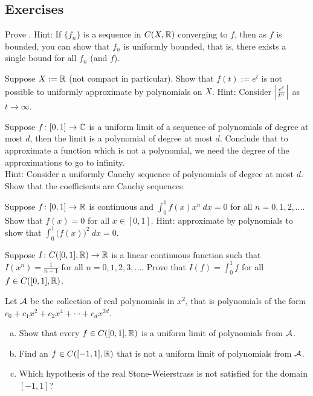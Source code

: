 \subsection{Exercises}

\begin{exercise}
Prove .
Hint: If $\{ f_n \}$ is a sequence in $C(X,{\mathbb{R}})$
converging to $f$, then as $f$ is bounded, you can show
that $f_n$ is uniformly bounded, that is, there exists a
single bound for all $f_n$ (and $f$).
\end{exercise}

\begin{exercise}
Suppose $X := {\mathbb{R}}$ (not compact in particular).
Show that $f(t) := e^t$ is not possible to uniformly approximate
by polynomials on $X$.  Hint: Consider $\left\lvert {\frac{e^t}{t^n}} \right\rvert$
as $t \to \infty$.
\end{exercise}

\begin{exercise}
Suppose $f \colon [0,1] \to {\mathbb{C}}$ is a uniform limit of a sequence of polynomials
of degree at most $d$, then the limit is a polynomial of degree at most $d$.
Conclude that to approximate a function which is not a polynomial, we
need the degree of the approximations to go to infinity.\\
Hint: Consider a uniformly Cauchy sequence of polynomials of degree at most
$d$.  Show that the coefficients are Cauchy sequences.
\end{exercise}

\begin{exercise}
Suppose $f \colon [0,1] \to {\mathbb{R}}$ is continuous and
$\int_0^1 f(x) x^n ~dx = 0$ for all $n = 0,1,2,\ldots$.
Show that $f(x) = 0$ for all $x \in [0,1]$.
Hint: approximate by polynomials to show that $\int_0^1 {\bigl( f(x)
\bigr)}^2 ~ dx = 0$.
\end{exercise}

\begin{exercise}
Suppose $I \colon C([0,1],{\mathbb{R}}) \to {\mathbb{R}}$ is 
a linear continuous function such that
$I(x^n) = \frac{1}{n+1}$
for all $n=0,1,2,3,\ldots$.
Prove that $I(f) = \int_0^1 f$ for all $f \in C([0,1],{\mathbb{R}})$.
\end{exercise}

\begin{exercise}
Let ${\mathcal{A}}$ be the collection of real polynomials in $x^2$,
that is polynomials of the form
$c_0 + c_1 x^2 + c_2 x^4 + \cdots + c_d x^{2d}$.
\begin{enumerate}[a)]
\item
Show that every $f \in C([0,1],{\mathbb{R}})$ is a uniform limit of
polynomials from ${\mathcal{A}}$.
\item
Find an $f \in  C([-1,1],{\mathbb{R}})$ that is not a
uniform limit of
polynomials from ${\mathcal{A}}$.
\item
Which hypothesis of the real Stone-Weierstrass is not satisfied
for the domain $[-1,1]$?
\end{enumerate}
\end{exercise}

